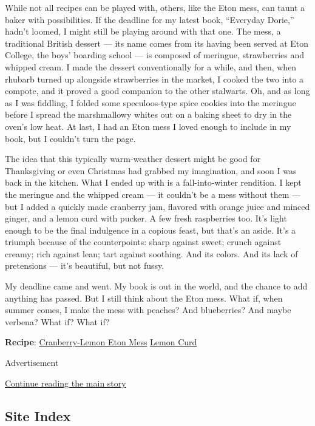 While not all recipes can be played with, others, like the Eton mess,
can taunt a baker with possibilities. If the deadline for my latest
book, ``Everyday Dorie,'' hadn't loomed, I might still be playing around
with that one. The mess, a traditional British dessert --- its name
comes from its having been served at Eton College, the boys' boarding
school --- is composed of meringue, strawberries and whipped cream. I
made the dessert conventionally for a while, and then, when rhubarb
turned up alongside strawberries in the market, I cooked the two into a
compote, and it proved a good companion to the other stalwarts. Oh, and
as long as I was fiddling, I folded some speculoos-type spice cookies
into the meringue before I spread the marshmallowy whites out on a
baking sheet to dry in the oven's low heat. At last, I had an Eton mess
I loved enough to include in my book, but I couldn't turn the page.

The idea that this typically warm-weather dessert might be good for
Thanksgiving or even Christmas had grabbed my imagination, and soon I
was back in the kitchen. What I ended up with is a fall-into-winter
rendition. I kept the meringue and the whipped cream --- it couldn't be
a mess without them --- but I added a quickly made cranberry jam,
flavored with orange juice and minced ginger, and a lemon curd with
pucker. A few fresh raspberries too. It's light enough to be the final
indulgence in a copious feast, but that's an aside. It's a triumph
because of the counterpoints: sharp against sweet; crunch against
creamy; rich against lean; tart against soothing. And its colors. And
its lack of pretensions --- it's beautiful, but not fussy.

My deadline came and went. My book is out in the world, and the chance
to add anything has passed. But I still think about the Eton mess. What
if, when summer comes, I make the mess with peaches? And blueberries?
And maybe verbena? What if? What if?

\textbf{Recipe}:
\href{https://cooking.nytimes3xbfgragh.onion/recipes/1019725-cranberry-lemon-eton-mess}{Cranberry-Lemon
Eton Mess} \textbar{}
\href{https://cooking.nytimes3xbfgragh.onion/recipes/1019737-lemon-curd}{Lemon
Curd}

Advertisement

\protect\hyperlink{after-bottom}{Continue reading the main story}

\hypertarget{site-index}{%
\subsection{Site Index}\label{site-index}}

